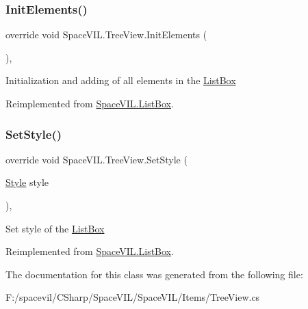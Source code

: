 \subsubsection{\texorpdfstring{Init\+Elements()}{InitElements()}}
{\footnotesize\ttfamily override void Space\+V\+I\+L.\+Tree\+View.\+Init\+Elements (\begin{DoxyParamCaption}{ }\end{DoxyParamCaption})\hspace{0.3cm}{\ttfamily [inline]}, {\ttfamily [virtual]}}



Initialization and adding of all elements in the \mbox{\hyperlink{class_space_v_i_l_1_1_list_box}{List\+Box}} 



Reimplemented from \mbox{\hyperlink{class_space_v_i_l_1_1_list_box_a6fd8d4f254ff3954eb217cda21ebca45}{Space\+V\+I\+L.\+List\+Box}}.

\mbox{\label{class_space_v_i_l_1_1_tree_view_aac5935163cddb3e34bcef8ee112ae1dd}} 
\subsubsection{\texorpdfstring{Set\+Style()}{SetStyle()}}
{\footnotesize\ttfamily override void Space\+V\+I\+L.\+Tree\+View.\+Set\+Style (\begin{DoxyParamCaption}\item[{\mbox{\hyperlink{class_space_v_i_l_1_1_decorations_1_1_style}{Style}}}]{style }\end{DoxyParamCaption})\hspace{0.3cm}{\ttfamily [inline]}, {\ttfamily [virtual]}}



Set style of the \mbox{\hyperlink{class_space_v_i_l_1_1_list_box}{List\+Box}} 



Reimplemented from \mbox{\hyperlink{class_space_v_i_l_1_1_list_box_aee5cd595b70e4ca4dff5022c662373d9}{Space\+V\+I\+L.\+List\+Box}}.



The documentation for this class was generated from the following file\+:\begin{DoxyCompactItemize}
\item 
F\+:/spacevil/\+C\+Sharp/\+Space\+V\+I\+L/\+Space\+V\+I\+L/\+Items/Tree\+View.\+cs\end{DoxyCompactItemize}

